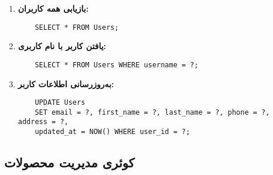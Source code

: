 \documentclass[12pt]{article}
\begin{document}
\begin{enumerate}
    \item \textbf{بازیابی همه کاربران:}
    \begin{latin}
    \begin{verbatim}
    SELECT * FROM Users;
    \end{verbatim}
    \end{latin}
    
    \item \textbf{یافتن کاربر با نام کاربری:}
    \begin{latin}
    \begin{verbatim}
    SELECT * FROM Users WHERE username = ?;
    \end{verbatim}
    \end{latin}
    
    \item \textbf{به‌روزرسانی اطلاعات کاربر:}
    \begin{latin}
    \begin{verbatim}
    UPDATE Users
    SET email = ?, first_name = ?, last_name = ?, phone = ?, address = ?,
    updated_at = NOW() WHERE user_id = ?;
    \end{verbatim}
    \end{latin}
\end{enumerate}

\subsection{کوئری مدیریت محصولات}
\end{document}
